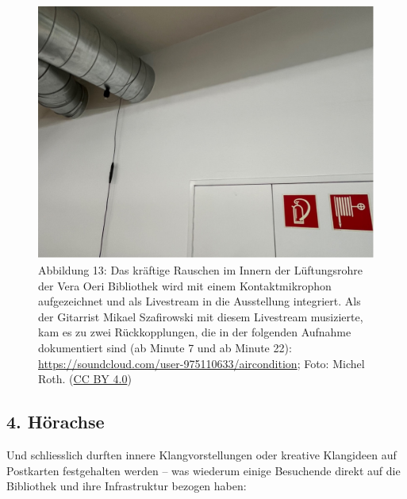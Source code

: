 \documentclass[a4paper,
fontsize=11pt,
oneside,
numbers=noperiodatend,
parskip=half-,
bibliography=totoc,
final
]{scrartcl}
\begin{document}
\begin{figure}
\centering
\includegraphics{img/Abb13.jpg}
\caption{Abbildung 13: Das kräftige Rauschen im Innern der Lüftungsrohre
der Vera Oeri Bibliothek wird mit einem Kontaktmikrophon aufgezeichnet
und als Livestream in die Ausstellung integriert. Als der Gitarrist
Mikael Szafirowski mit diesem Livestream musizierte, kam es zu zwei
Rückkopplungen, die in der folgenden Aufnahme dokumentiert sind (ab
Minute 7 und ab Minute 22):
\url{https://soundcloud.com/user-975110633/aircondition}; Foto: Michel
Roth. (\href{https://creativecommons.org/licenses/by/4.0/}{CC BY 4.0})}
\end{figure}

\hypertarget{huxf6rachse-3}{%
\subsection{4. Hörachse}\label{huxf6rachse-3}}

Und schliesslich durften innere Klangvorstellungen oder kreative
Klangideen auf Postkarten festgehalten werden -- was wiederum einige
Besuchende direkt auf die Bibliothek und ihre Infrastruktur bezogen
haben:
\end{document}
